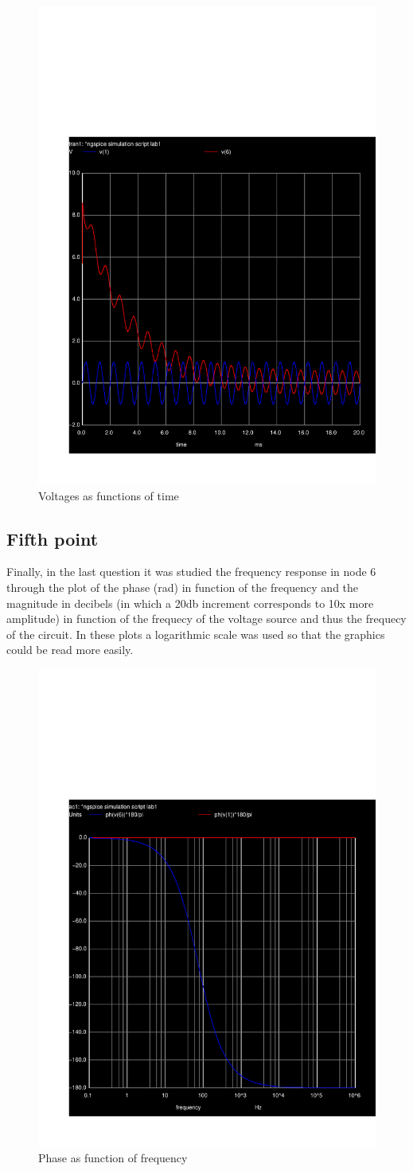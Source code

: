 \begin{figure}[h!] \centering
\includegraphics[width=0.6\linewidth]{teste_4.pdf}
\caption{Voltages as functions of time}
\label{fig:V(t)}
\end{figure}

\subsection{Fifth point}
\label{ssec:5S}

\par Finally, in the last question it was studied the frequency response in node 6 through the plot of the phase (rad) in function of the frequency and the magnitude in decibels (in which a 20db increment corresponds to 10x more amplitude) in function of the frequecy of the voltage source and thus the frequecy of the circuit. In these plots a logarithmic scale was used so that the graphics could be read more easily. 

\begin{figure}[h!] \centering
\includegraphics[width=0.45\linewidth]{teste_5_p.pdf}
\caption{Phase as function of frequency}
\label{fig:Ph(v(1))*180/pi Ph(v(6))*180/pi}
\end{figure}


